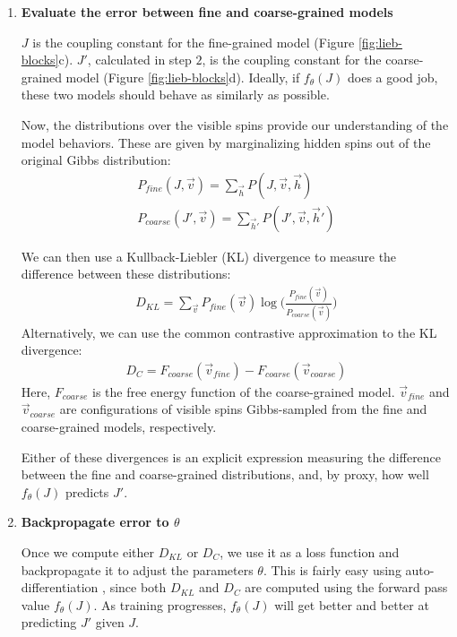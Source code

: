 \documentclass[%
    reprint,
    amsmath,amssymb,
    aps,
]{revtex4-2}
\begin{document}
\begin{enumerate}
    \item {
        \textbf{Evaluate the error between fine and coarse-grained models}

        $J$ is the coupling constant for the fine-grained model (Figure \ref{fig:lieb-blocks}c). 
        $J'$, calculated in step $2$, is the coupling constant for the coarse-grained model (Figure \ref{fig:lieb-blocks}d). 
        Ideally, if $f_\theta(J)$ does a good job, these two models should behave as similarly as possible. 
        
        Now, the distributions over the visible spins provide our understanding of the model behaviors. 
        These are given by marginalizing hidden spins out of the original Gibbs distribution:
        \begin{eqnarray}
            \label{eqn:kl-divergence}
            P_{fine}(J, \vec{v}) = \sum_{\vec{h}} P(J, \vec{v}, \vec{h}) \\
            P_{coarse}(J', \vec{v}) = \sum_{\vec{h}'} P(J', \vec{v}, \vec{h}')
        \end{eqnarray}
        
        We can then use a Kullback-Liebler (KL) divergence to measure the difference between these distributions:
        \begin{eqnarray}
            D_{KL} = \sum_{\vec{v}} P_{fine}(\vec{v}) \log \Bigr( \frac{P_{fine}(\vec{v})}{P_{coarse}(\vec{v})} \Bigr)
        \end{eqnarray}
        Alternatively, we can use the common contrastive approximation \cite{contrastive-divergence} to the KL divergence:
        \begin{eqnarray}
            D_{C} = F_{coarse}(\vec{v}_{fine}) - F_{coarse}(\vec{v}_{coarse})
        \end{eqnarray}
        Here, $F_{coarse}$ is the free energy function of the coarse-grained model. 
        $\vec{v}_{fine}$ and $\vec{v}_{coarse}$ are configurations of visible spins Gibbs-sampled from the fine and coarse-grained models, respectively. 

        Either of these divergences is an explicit expression measuring the difference between the fine and coarse-grained distributions, and, by proxy, how well $f_\theta(J)$ predicts $J'$. 
    }
    
    \item{
        \textbf{Backpropagate error to $\theta$}

        Once we compute either $D_{KL}$ or $D_C$, we use it as a loss function and backpropagate \cite{backprop} it to adjust the parameters $\theta$. 
        This is fairly easy using auto-differentiation \cite{pytorch}, since both $D_{KL}$ and $D_C$ are computed using the forward pass value $f_\theta (J)$. 
        As training progresses, $f_\theta (J)$ will get better and better at predicting $J'$ given $J$. 
    }
    
\end{enumerate}
\end{document}
